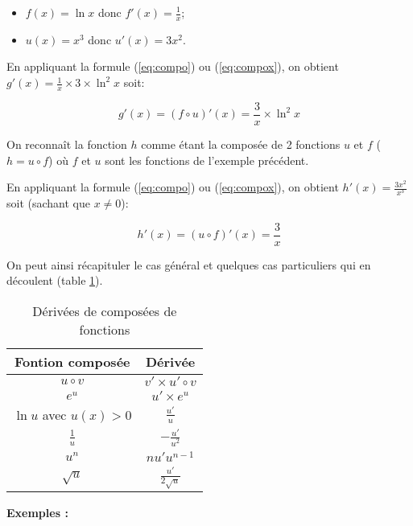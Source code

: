 \documentclass[a4paper,12pt]{scrartcl}
\begin{document}
\begin{itemize}
 \item $f(x) = \ln x$ donc $f'(x) = \frac{1}{x}$;
 \item $u(x) = x^3$ donc $u'(x) = 3x^2$.
\end{itemize}

En appliquant la formule (\ref{eq:compo}) ou (\ref{eq:compox}), on obtient
$g'(x) = \frac{1}{x} \times 3 \times \ln^2 x$ soit:

\begin{equation*}
 g'(x) = (f \circ u)'(x) = \frac{3}{x} \times \ln^2 x
\end{equation*}


On reconnaît la fonction $h$ comme étant la composée de 2 fonctions $u$ et $f$ ($h = u \circ f$) où $f$ et $u$ sont les fonctions de l'exemple précédent.

En appliquant la formule (\ref{eq:compo}) ou (\ref{eq:compox}), on obtient
$h'(x) = \frac{3x^2}{x^3} $ soit (sachant que $x \neq 0$):

\begin{equation*}
 h'(x) = (u \circ f)'(x) = \frac{3}{x}
\end{equation*}

On peut ainsi récapituler le cas général et quelques cas particuliers qui en découlent (table \ref{tab:composees}).

\begin{table}[h!]
\centering
\begin{tabular}{|c|c|}
\hline
 \textbf{Fontion composée} & \textbf{Dérivée} \\ \hline\hline
$u \circ v$  & $v' \times u' \circ v$ \\ \hline\hline
$e^{u}$ & $u' \times e^{u}$ \\ \hline
 $\ln u$ avec $u(x) > 0$ & $\frac{u'}{u} $ \\ \hline
 $\frac{1}{u}$ & $-\frac{u'}{u^2}$ \\ \hline
 $u^n$ & $n u' u^{n-1}$ \\ \hline
 $\sqrt{u}$ & $\frac{u'}{2\sqrt{u}}$ \\ \hline
\end{tabular}
 \caption{Dérivées de composées de fonctions}
 \label{tab:composees}
\end{table}

\textbf{Exemples :}
\end{document}
